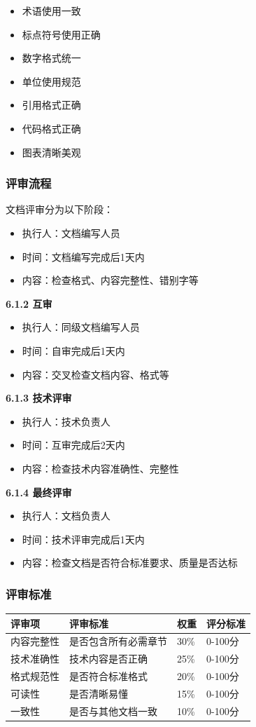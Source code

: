 \documentclass[12pt,a4paper]{article}
\numberwithin{equation}{section}  %
\begin{document}
\begin{itemize}
\item [ ] 术语使用一致
\item [ ] 标点符号使用正确
\item [ ] 数字格式统一
\item [ ] 单位使用规范
\item [ ] 引用格式正确
\item [ ] 代码格式正确
\item [ ] 图表清晰美观
\end{itemize}

\subsubsection{评审流程}
文档评审分为以下阶段：
\begin{itemize}
\item 执行人：文档编写人员
\item 时间：文档编写完成后1天内
\item 内容：检查格式、内容完整性、错别字等
\end{itemize}

\textbf{6.1.2 互审}
\begin{itemize}
\item 执行人：同级文档编写人员
\item 时间：自审完成后1天内
\item 内容：交叉检查文档内容、格式等
\end{itemize}

\textbf{6.1.3 技术评审}
\begin{itemize}
\item 执行人：技术负责人
\item 时间：互审完成后2天内
\item 内容：检查技术内容准确性、完整性
\end{itemize}

\textbf{6.1.4 最终评审}
\begin{itemize}
\item 执行人：文档负责人
\item 时间：技术评审完成后1天内
\item 内容：检查文档是否符合标准要求、质量是否达标
\end{itemize}

\subsubsection{评审标准}
\begin{longtable}{|p{3cm}|p{4cm}|p{4cm}|p{3cm}|}
\hline
评审项 & 评审标准 & 权重 & 评分标准 \\
\hline
内容完整性 & 是否包含所有必需章节 & 30\% & 0-100分 \\
技术准确性 & 技术内容是否正确 & 25\% & 0-100分 \\
格式规范性 & 是否符合标准格式 & 20\% & 0-100分 \\
可读性 & 是否清晰易懂 & 15\% & 0-100分 \\
一致性 & 是否与其他文档一致 & 10\% & 0-100分 \\
\hline
\end{longtable}
\end{document}
